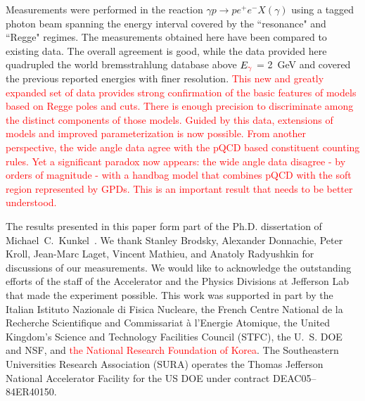 \documentclass[aps,prc,twocolumn,floatfix,showpacs,preprintnumbers,amsmath,amssymb,superscriptaddress,linenumbers]{revtex4-1}
\begin{document}
Measurements were 
performed in the reaction $\gamma p\rightarrow pe^+e^-X(\gamma)$ 
using a tagged photon beam spanning the energy interval covered 
by the ``resonance" and ``Regge" regimes.
The measurements obtained here have been compared to existing 
data. The overall agreement is good, while the data provided 
here quadrupled the world bremsstrahlung database above $E_{\textcolor{red}{\gamma}}$ = 
2~GeV and covered the previous reported energies with finer 
resolution. \textcolor{red}{This new and greatly expanded set of data provides strong confirmation of the basic features of models based on Regge poles and cuts. There is enough precision to discriminate among the distinct components of those models. Guided by this data, extensions of models and improved parameterization is now possible. From another perspective, the wide angle data agree with the pQCD based constituent counting rules. Yet a significant paradox now appears: the wide angle data disagree - by orders of magnitude - with a handbag model that combines pQCD with the soft region represented by GPDs. This is an important result that needs to be better understood.}

  
The results presented in this paper form part of the 
Ph.D. dissertation of Michael~C.~Kunkel~\cite{KunkelPhD}.  We thank Stanley Brodsky, 
Alexander Donnachie, Peter Kroll, Jean-Marc Laget, Vincent Mathieu, 
and Anatoly Radyushkin for discussions of our measurements. We 
would like to acknowledge the outstanding efforts of the staff of 
the Accelerator and the Physics Divisions at Jefferson Lab that 
made the experiment possible.  This work was supported in part by 
the Italian Istituto Nazionale di Fisica Nucleare, the French 
Centre National de la Recherche Scientifique and Commissariat \`a 
l'Energie Atomique, the United Kingdom's Science and Technology 
Facilities Council (STFC), the U.~S. DOE and NSF, and \textcolor{red}{the National Research Foundation of Korea}. The Southeastern Universities 
Research Association (SURA) operates the Thomas Jefferson National 
Accelerator Facility for the US DOE under contract DEAC05--84ER40150.
\end{document}
